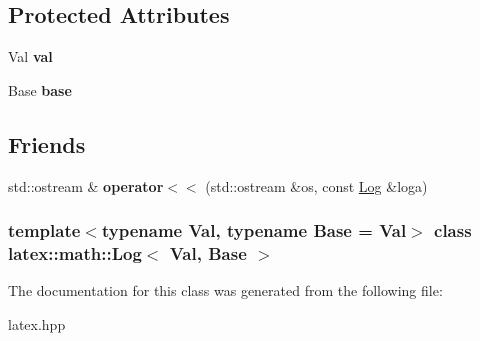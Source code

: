 \subsection*{\-Protected \-Attributes}
\begin{DoxyCompactItemize}
\item 
\hypertarget{classlatex_1_1math_1_1Log_a7f4ac09a355183bcec59b0f7fe686f43}{\-Val {\bfseries val}}\label{classlatex_1_1math_1_1Log_a7f4ac09a355183bcec59b0f7fe686f43}

\item 
\hypertarget{classlatex_1_1math_1_1Log_a487bc150b50dd56998b2541ae5c335ab}{\-Base {\bfseries base}}\label{classlatex_1_1math_1_1Log_a487bc150b50dd56998b2541ae5c335ab}

\end{DoxyCompactItemize}
\subsection*{\-Friends}
\begin{DoxyCompactItemize}
\item 
\hypertarget{classlatex_1_1math_1_1Log_ab9f88137b0d5fb0ab0f04bf4003514fe}{std\-::ostream \& {\bfseries operator$<$$<$} (std\-::ostream \&os, const \hyperlink{classlatex_1_1math_1_1Log}{\-Log} \&loga)}\label{classlatex_1_1math_1_1Log_ab9f88137b0d5fb0ab0f04bf4003514fe}

\end{DoxyCompactItemize}
\subsubsection*{template$<$typename \-Val, typename \-Base = \-Val$>$ class latex\-::math\-::\-Log$<$ Val, Base $>$}



\-The documentation for this class was generated from the following file\-:\begin{DoxyCompactItemize}
\item 
latex.\-hpp\end{DoxyCompactItemize}
